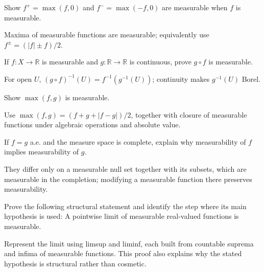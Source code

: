 \begin{problem}\label{prob:iii02-problem-05}
Show \(f^+=\max(f,0)\) and \(f^-=\max(-f,0)\) are measurable when \(f\) is measurable.
\end{problem}
\begin{solution}
Maxima of measurable functions are measurable; equivalently use
\(f^\pm=(|f|\pm f)/2\).
\end{solution}

\begin{problem}\label{prob:iii02-problem-06}
If \(f:X\to\mathbb R\) is measurable and \(g:\mathbb R\to\mathbb R\) is continuous, prove \(g\circ f\) is measurable.
\end{problem}
\begin{solution}
For open \(U\), \((g\circ f)^{-1}(U)=f^{-1}(g^{-1}(U))\); continuity makes
\(g^{-1}(U)\) Borel.
\end{solution}

\begin{problem}\label{prob:iii02-problem-07}
Show \(\max(f,g)\) is measurable.
\end{problem}
\begin{solution}
Use \(\max(f,g)=(f+g+|f-g|)/2\), together with closure of measurable
functions under algebraic operations and absolute value.
\end{solution}

\begin{problem}\label{prob:iii02-problem-08}
If \(f=g\) a.e. and the measure space is complete, explain why measurability of \(f\) implies measurability of \(g\).
\end{problem}
\begin{solution}
They differ only on a measurable null set together with its subsets, which
are measurable in the completion; modifying a measurable function there
preserves measurability.
\end{solution}

\begin{problem}\label{prob:iii02-problem-09}
Prove the following structural statement and identify the step where its main hypothesis is used: A pointwise limit of measurable real-valued functions is measurable.
\end{problem}
\begin{solution}
Represent the limit using limsup and liminf, each built from countable suprema and infima of measurable functions. This proof also explains why the stated hypothesis is structural rather than cosmetic.
\end{solution}

